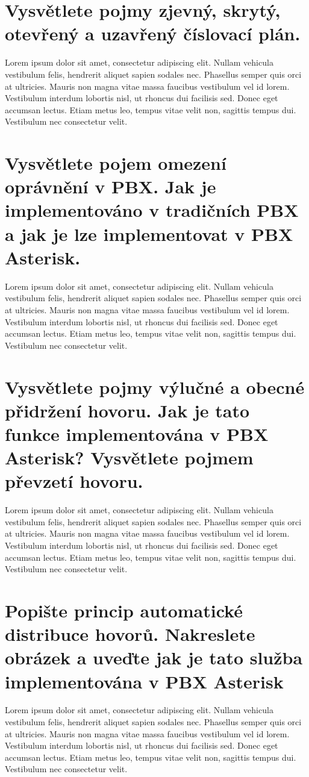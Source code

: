 \section{Vysvětlete pojmy zjevný, skrytý, otevřený a uzavřený číslovací plán.}
Lorem ipsum dolor sit amet, consectetur adipiscing elit. Nullam vehicula vestibulum felis, hendrerit aliquet sapien sodales nec. Phasellus semper quis orci at ultricies. Mauris non magna vitae massa faucibus vestibulum vel id lorem. Vestibulum interdum lobortis nisl, ut rhoncus dui facilisis sed. Donec eget accumsan lectus. Etiam metus leo, tempus vitae velit non, sagittis tempus dui. Vestibulum nec consectetur velit.

\section{Vysvětlete pojem omezení oprávnění v PBX. Jak je implementováno v tradičních PBX a jak je lze implementovat v PBX Asterisk.}
Lorem ipsum dolor sit amet, consectetur adipiscing elit. Nullam vehicula vestibulum felis, hendrerit aliquet sapien sodales nec. Phasellus semper quis orci at ultricies. Mauris non magna vitae massa faucibus vestibulum vel id lorem. Vestibulum interdum lobortis nisl, ut rhoncus dui facilisis sed. Donec eget accumsan lectus. Etiam metus leo, tempus vitae velit non, sagittis tempus dui. Vestibulum nec consectetur velit.

\section{Vysvětlete pojmy výlučné a obecné přidržení hovoru. Jak je tato funkce implementována v PBX Asterisk? Vysvětlete pojmem převzetí hovoru.}
Lorem ipsum dolor sit amet, consectetur adipiscing elit. Nullam vehicula vestibulum felis, hendrerit aliquet sapien sodales nec. Phasellus semper quis orci at ultricies. Mauris non magna vitae massa faucibus vestibulum vel id lorem. Vestibulum interdum lobortis nisl, ut rhoncus dui facilisis sed. Donec eget accumsan lectus. Etiam metus leo, tempus vitae velit non, sagittis tempus dui. Vestibulum nec consectetur velit.

\section{Popište princip automatické distribuce hovorů. Nakreslete obrázek a uveďte jak je tato služba implementována v PBX Asterisk}
Lorem ipsum dolor sit amet, consectetur adipiscing elit. Nullam vehicula vestibulum felis, hendrerit aliquet sapien sodales nec. Phasellus semper quis orci at ultricies. Mauris non magna vitae massa faucibus vestibulum vel id lorem. Vestibulum interdum lobortis nisl, ut rhoncus dui facilisis sed. Donec eget accumsan lectus. Etiam metus leo, tempus vitae velit non, sagittis tempus dui. Vestibulum nec consectetur velit.

